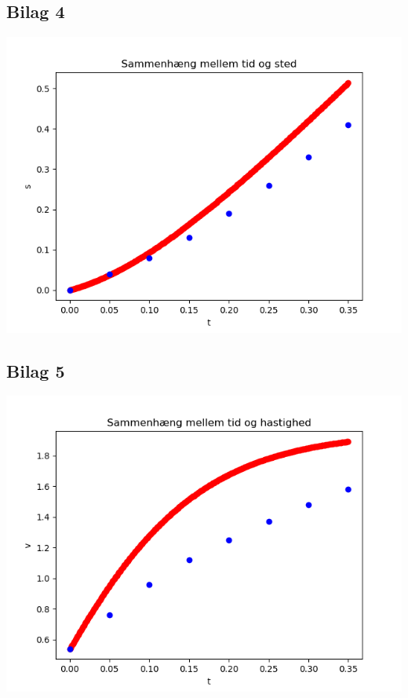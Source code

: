 \documentclass[12pt]{article}
\begin{document}
\subsection*{Bilag 4}
\begin{center}
\includegraphics[width=\linewidth]{sted.png}
\end{center}

\subsection*{Bilag 5}
\begin{center}
\includegraphics[width=\linewidth]{hastighed.png}
\end{center}
\end{document}
